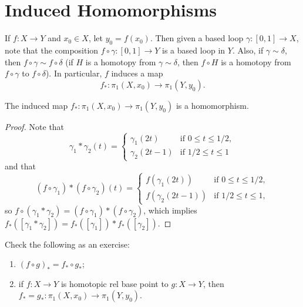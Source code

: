 \section{Induced Homomorphisms}

\begin{remark}
  If $f : X \to Y$ and $x_0 \in X$, let
  $y_0 = f(x_0)$. Then given a based loop
  $\gamma : [0, 1] \to X$, note that the composition
  $f \circ \gamma : [0, 1] \to Y$ is a based loop
  in $Y$. Also, if $\gamma \sim \delta$, then
  $f \circ \gamma \sim f \circ \delta$ (if
  $H$ is a homotopy from $\gamma \sim \delta$, then
  $f \circ H$ is a homotopy from $f \circ \gamma$
  to $f \circ \delta$). In particular,
  $f$ induces a map
  \[f_* : \pi_1(X, x_0) \to \pi_1(Y, y_0).\]
\end{remark}

\begin{lemma}
  The induced map $f_* : \pi_1(X, x_0) \to \pi_1(Y, y_0)$ is a homomorphism.
\end{lemma}

\begin{proof}
  Note that
  \[
    \gamma_1 * \gamma_2(t) =
    \begin{cases}
      \gamma_1(2t) & \text{if } 0 \le t \le 1 / 2, \\
      \gamma_2(2t - 1) & \text{if } 1 / 2 \le t \le 1
    \end{cases}
  \]
  and that
  \[
    (f \circ \gamma_1) * (f \circ \gamma_2)(t) =
    \begin{cases}
      f(\gamma_1(2t)) & \text{if } 0 \le t \le 1 / 2, \\
      f(\gamma_2(2t - 1)) & \text{if } 1 / 2 \le t \le 1,
    \end{cases}
  \]
  so $f \circ (\gamma_1 * \gamma_2) = (f \circ \gamma_1) * (f \circ \gamma_2)$, which implies
  $f_*([\gamma_1 * \gamma_2]) = f_*([\gamma_1]) * f_*([\gamma_2])$.
\end{proof}

\begin{exercise}
  Check the following as an exercise:
  \begin{enumerate}
    \item $(f \circ g)_* = f_* \circ g_*$;
    \item if $f : X \to Y$ is homotopic rel
      base point to $g : X \to Y$, then
      $f_* = g_* : \pi_1(X, x_0) \to \pi_1(Y, y_0)$.
  \end{enumerate}
\end{exercise}

